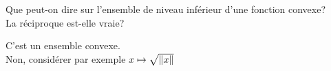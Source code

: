 \begin{note}
  \begin{field}
    Que peut-on dire sur l'ensemble de niveau inférieur d'une fonction
    convexe?\\
    La réciproque est-elle vraie?
  \end{field}
  \begin{field}
    C'est un ensemble convexe.\\
    Non, considérer par exemple $x \mapsto \sqrt{\left\lVert x\right\rVert
    }$
  \end{field}
  \begin{field}

  \end{field}
\end{note}



